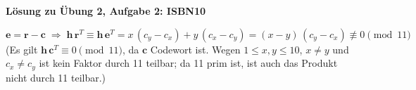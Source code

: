 \textbf{Lösung zu Übung 2, Aufgabe 2: ISBN10}

\begin{loesung}
\[
\mathbf{e} = \mathbf{r} - \mathbf{c} \;\Rightarrow\; \mathbf{h}\,\mathbf{r}^T \equiv \mathbf{h}\,\mathbf{e}^T = x\,(c_y - c_x) + y\,(c_x - c_y) = (x - y)\,(c_y - c_x) \not\equiv 0 \pmod{11}
\]
(Es gilt $\mathbf{h}\,\mathbf{c}^T \equiv 0 \pmod{11}$, da $\mathbf{c}$ Codewort ist. Wegen $1 \le x, y \le 10$, $x \neq y$ und $c_x \neq c_y$ ist kein Faktor durch 11 teilbar; da 11 prim ist, ist auch das Produkt nicht durch 11 teilbar.)
\end{loesung}
